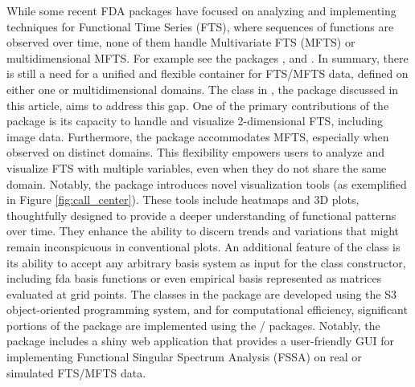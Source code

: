 While some recent FDA packages have focused on analyzing and implementing techniques for Functional Time Series (FTS), where sequences of functions are observed over time, none of them handle Multivariate FTS (MFTS) or multidimensional MFTS.  For example see the packages ,  and . In summary, there is still a need for a unified and flexible container for FTS/MFTS data, defined on either one or multidimensional domains. The  class in  \citep{rfssapackage},
the package discussed in this article, aims to address this gap. One of the primary contributions of the package is its capacity to handle and visualize 2-dimensional FTS, including image data. Furthermore, the package accommodates MFTS, especially when observed on distinct domains. This flexibility empowers users to analyze and visualize FTS with multiple variables, even when they do not share the same domain. Notably, the  package introduces novel visualization tools (as exemplified in Figure \ref{fig:call_center}). These tools include heatmaps and 3D plots, thoughtfully designed to provide a deeper understanding of functional patterns over time. They enhance the ability to discern trends and variations that might remain inconspicuous in conventional plots. An additional feature of the  class is its ability to accept any arbitrary basis system as input for the class constructor, including fda basis functions or even empirical basis represented as matrices evaluated at grid points. The classes in the  package are developed using the S3 object-oriented programming system, and for computational efficiency, significant portions of the package are implemented using the / packages. Notably, the package includes a shiny web application that provides a user-friendly GUI for implementing Functional Singular Spectrum Analysis (FSSA) on real or simulated FTS/MFTS data.

